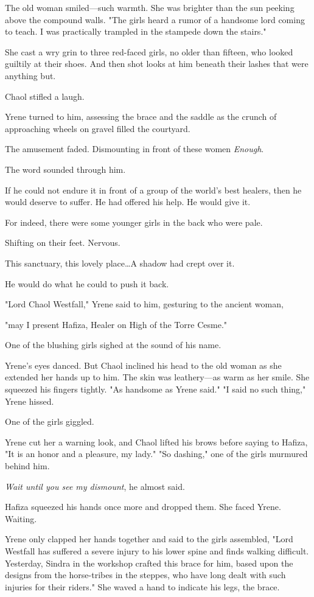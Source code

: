 The old woman smiled---such warmth.
She was brighter than the sun peeking above the compound walls.
"The girls heard a rumor of a handsome lord coming to teach.
I was practically trampled in the stampede down the stairs."

She cast a wry grin to three red-faced girls, no older than fifteen, who looked guiltily at their shoes.
And then shot looks at him beneath their lashes that were anything but.

Chaol stifled a laugh.

Yrene turned to him, assessing the brace and the saddle as the crunch of approaching wheels on gravel filled the courtyard.

The amusement faded.
Dismounting in front of these women 
\emph{Enough}.

The word sounded through him.

If he could not endure it in front of a group of the world's best healers, then he would deserve to suffer.
He had offered his help.
He would give it.

For indeed, there were some younger girls in the back who were pale.

Shifting on their feet.
Nervous.

This sanctuary, this lovely place\ldots A shadow had crept over it.

He would do what he could to push it back.

"Lord Chaol Westfall," Yrene said to him, gesturing to the ancient woman,

"may I present Hafiza, Healer on High of the Torre Cesme."

One of the blushing girls sighed at the sound of his name.

Yrene's eyes danced.
But Chaol inclined his head to the old woman as she extended her hands up to him.
The skin was leathery---as warm as her smile.
She squeezed his fingers tightly.
"As handsome as Yrene said."
"I said no such thing," Yrene hissed.

One of the girls giggled.

Yrene cut her a warning look, and Chaol lifted his brows before saying to Hafiza, "It is an honor and a pleasure, my lady."
"So dashing," one of the girls murmured behind him.

\emph{Wait until you see my dismount}, he almost said.

Hafiza squeezed his hands once more and dropped them.
She faced Yrene.
Waiting.

Yrene only clapped her hands together and said to the girls assembled, "Lord Westfall has suffered a severe injury to his lower spine and finds walking difficult.
Yesterday, Sindra in the workshop crafted this brace for him, based upon the designs from the horse-tribes in the steppes, who have long dealt with such injuries for their riders."
She waved a hand to indicate his legs, the brace.


